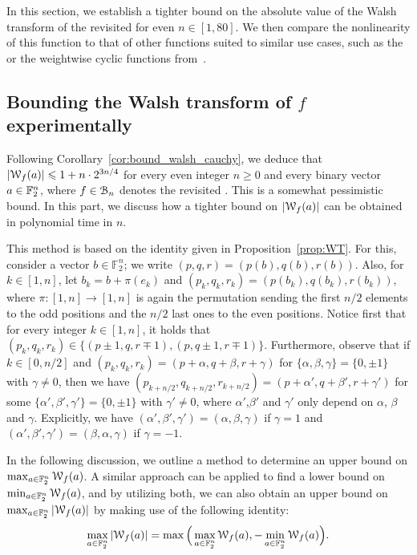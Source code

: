 \documentclass{llncs}
\begin{document}
In this section, we establish a tighter bound on the absolute value of the Walsh transform of the revisited \hwbf{} for even $n\in[1,80]$. We then compare the nonlinearity of this function to that of other functions suited to similar use cases, such as the \hwbf{} or the weightwise cyclic functions from~\cite{DAM:MeaOza24}.

\subsection{Bounding the Walsh transform of $f$ experimentally}\label{sec:expwt}

Following Corollary~\ref{cor:bound_walsh_cauchy}, we deduce that $|\mathcal W_{f}(a)|\leqslant 1+n\cdot 2^{3n/4}$ for every even integer $n\geq 0$ and every binary vector $a\in\mathbb{F}_2^n$, where $f\in\mathcal{B}_n$ denotes the revisited \hwbf{}. This is a somewhat pessimistic bound. In this part, we discuss how a tighter bound on $|\mathcal W_{f}(a)|$ can be obtained in polynomial time in $n$.

This method is based on the identity given in Proposition~\ref{prop:WT}.
For this, consider a vector $b\in\mathbb F_2^n$; we write $(p,q,r)=(p(b),q(b),r(b))$. Also, for $k\in[1,n]$, let $b_k=b+\pi(e_k)$ and $(p_k,q_k,r_k)=(p(b_k),q(b_k),r(b_k))$, where $\pi:[1,n]\to[1,n]$ is again the permutation sending the first $n/2$ elements to the odd positions and the $n/2$ last ones to the even positions. Notice first that for every integer $k\in[1,n]$, it holds that $(p_k,q_k,r_k)\in\{(p\pm1,q,r\mp 1),(p,q\pm 1,r\mp 1)\}$. Furthermore, observe that if $k\in[0,n/2]$ and $(p_k,q_k,r_k)=(p+\alpha,q+\beta,r+\gamma)$ for $\{\alpha,\beta,\gamma\}=\{0,\pm 1\}$ with $\gamma\neq 0$, then we have $(p_{k+n/2},q_{k+n/2},r_{k+n/2})=(p+\alpha',q+\beta',r+\gamma')$ for some $\{\alpha',\beta',\gamma'\}=\{0,\pm 1\}$ with $\gamma'\neq 0$, where $\alpha'$,$\beta'$ and $\gamma'$ only depend on $\alpha$, $\beta$ and $\gamma$. Explicitly, we have $(\alpha',\beta',\gamma')=(\alpha,\beta,\gamma)$ if $\gamma=1$ and $(\alpha',\beta',\gamma')=(\beta,\alpha,\gamma)$ if $\gamma=-1$.

In the following discussion, we outline a method to determine an upper bound on $\max_{a\in\mathbb{F}_2^n}\mathcal W_{f}(a)$. A similar approach can be applied to find a lower bound on $\min_{a\in\mathbb{F}_2^n}\mathcal W_{f}(a)$, and by utilizing both, we can also obtain an upper bound on $\max_{a\in\mathbb{F}_2^n}|\mathcal W_{f}(a)|$ by making use of the following identity:
\[
	\max_{a\in\mathbb{F}_2^n}|\mathcal W_{f}(a)|=\max\Big(\max_{a\in\mathbb{F}_2^n}\mathcal W_{f}(a),-\min_{a\in\mathbb{F}_2^n}\mathcal W_{f}(a)\Big).
\]
\end{document}

